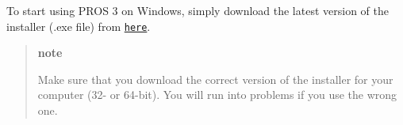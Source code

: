 To start using P\+R\+OS 3 on Windows, simply download the latest version of the installer (.exe file) from \href{https://github.com/purduesigbots/pros-cli3/releases/latest/}{\tt here}.

\begin{quote}
{\bfseries note}

Make sure that you download the correct version of the installer for your computer (32-\/ or 64-\/bit). You will run into problems if you use the wrong one.\end{quote}
